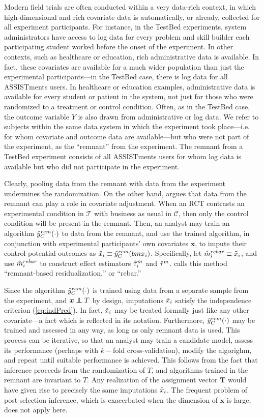 Modern field trials are often conducted within a very data-rich
context, in which high-dimensional and rich covariate data is
automatically, or already, collected for all experiment participants.
For instance, in the TestBed experiments, system administrators have
access to log data for every problem and skill builder each
participating student worked before the onset of the experiment.
In other contexts, such as healthcare or education, rich
administrative data is available.
In fact, these covariates are available for a much wider population
than just the experimental participants---in the TestBed case, there
is log data for all ASSISTments users.
In healthcare or education examples, administrative data is available
for every student or patient in the system, not just for those who
were randomized to a treatment or control condition.
Often, as in the TestBed case, the outcome variable $Y$ is also drawn from administrative or
log data.
We refer to subjects within the same data system in which the
experiment took place---i.e. for whom covariate and outcome data are
available---but who were not part of the experiment, as the ``remnant'' from the experiment.
The remnant from a TestBed experiment consists of all ASSISTments
users for whom log data is available but who did not participate in
the experiment.

Clearly, pooling data from the remnant with data from the experiment
undermines the randomization.
On the other hand, \citet{rebarEDM} argues that data from the remnant
can play a role in covariate adjustment.
When an RCT contrasts an experimental condition in $\mathcal{T}$ with
business as usual in $\mathcal{C}$, then only the control condition
will be present in the remnant.
Then, an analyst may train an algorithm $\hat{y}_C^{rem}(\cdot)$ to data
from the remnant, and use the trained algorithm, in conjunction with
experimental participants' own covariates $\bm{x}$, to impute their
control potential outcomes as $\tilde{x}_i\equiv \hat{y}_C^{rem}(bm{x}_i)$.
Specifically, let $\hat{m}_i^{rebar} \equiv \tilde{x}_i$, and
use $\hat{m}_i^{rebar}$ to construct effect estimators $\hat{\tau}_i^m$ and
$\hat{\tau}^m$.
\citet{rebarEDM} calls this method ``remnant-based residualization,''
or ``rebar.''

Since the algorithm $\hat{y}_C^{rem}(\cdot) $ is trained using data from a
separate sample from the experiment, and $\bm{x}\independent T$ by
design, imputations $\tilde{x}_i $ satisfy the
independence criterion (\ref{eq:indPred}).
In fact, $\tilde{x}_i$ may be treated formally just like any other
covariate---a fact which is reflected in its notation.
Furthermore, $\hat{y}_C^{rem}(\cdot)$ may be trained and assessed in any way, as
long as only remnant data is used.
This process can be iterative, so that an analyst may train a candidate
model, assess its performance (perhaps with $k-$fold
cross-validation), modify the algorighm, and repeat until suitable
performance is achieved.
This follows from the fact that inference proceeds from the
randomization of $T$, and algorithms trained in the remnant are invariant to
$T$.
Any realization of the assignment vector $\bm{T}$ would have given
rise to precisely the same imputations $\tilde{x}_i $.
The frequent problem of post-selection inference, which is exacerbated
when the dimension of $\bm{x}$ is large, does not apply here.


